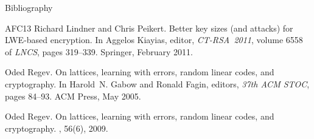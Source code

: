 \documentclass[10pt,compress]{beamer}
\begin{document}
\begin{frame}{Bibliography}
\begin{tiny}
\begin{thebibliography}{AFC{\etalchar{+}}13}
Richard Lindner and Chris Peikert.
\newblock Better key sizes (and attacks) for {LWE}-based encryption.
\newblock In Aggelos Kiayias, editor, {\em CT-RSA~2011}, volume 6558 of {\em
  {LNCS}}, pages 319--339. Springer, February 2011.

Oded Regev.
\newblock On lattices, learning with errors, random linear codes, and
  cryptography.
\newblock In Harold~N. Gabow and Ronald Fagin, editors, {\em 37th ACM STOC},
  pages 84--93. {ACM} Press, May 2005.

Oded Regev.
\newblock On lattices, learning with errors, random linear codes, and
  cryptography.
, 56(6), 2009.

\end{thebibliography}
\end{tiny}
\end{frame}
\end{document}
